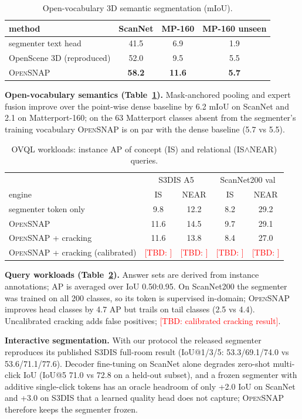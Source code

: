 \documentclass[conference]{IEEEtran}
\newcommand{\TBD}[1]{\textcolor{red}{[TBD: #1]}}
\newcommand{\sys}{\textsc{OpenSNAP}}
\newcommand{\ovql}{\textsc{OVQL}}
\begin{document}
\begin{table}[t]\centering\caption{Open-vocabulary 3D semantic segmentation (mIoU).}\label{tab:semseg}
\begin{tabular}{lccc}\toprule
method & ScanNet & MP-160 & MP-160 unseen \\\midrule
segmenter text head & 41.5 & 6.9 & 1.9 \\
OpenScene 3D (reproduced) & 52.0 & 9.5 & 5.5 \\
\sys{} & \textbf{58.2} & \textbf{11.6} & \textbf{5.7} \\\bottomrule
\end{tabular}\end{table}

\textbf{Open-vocabulary semantics (Table~\ref{tab:semseg}).} Mask-anchored pooling and expert fusion improve over the
point-wise dense baseline by 6.2 mIoU on ScanNet and 2.1 on Matterport-160; on the 63 Matterport classes absent from the
segmenter's training vocabulary \sys{} is on par with the dense baseline (5.7 vs 5.5).

\begin{table}[t]\centering\caption{\ovql{} workloads: instance AP of concept (\textsf{IS}) and relational
(\textsf{IS}$\wedge$\textsf{NEAR}) queries.}\label{tab:queries}
\begin{tabular}{lcccc}\toprule
 & \multicolumn{2}{c}{S3DIS A5} & \multicolumn{2}{c}{ScanNet200 val} \\
engine & IS & NEAR & IS & NEAR \\\midrule
segmenter token only & 9.8 & 12.2 & 8.2 & 29.2 \\
\sys{} & 11.6 & 14.5 & 9.7 & 29.1 \\
\sys{} + cracking & 11.6 & 13.8 & 8.4 & 27.0 \\
\sys{} + cracking (calibrated) & \TBD{} & \TBD{} & \TBD{} & \TBD{} \\\bottomrule
\end{tabular}\end{table}

\textbf{Query workloads (Table~\ref{tab:queries}).} Answer sets are derived from instance annotations; AP is averaged
over IoU 0.50:0.95. On ScanNet200 the segmenter was trained on all 200 classes, so its token is supervised in-domain;
\sys{} improves head classes by 4.7 AP but trails on tail classes (2.5 vs 4.4). Uncalibrated cracking adds false
positives; \TBD{calibrated cracking result}.

\textbf{Interactive segmentation.} With our protocol the released segmenter reproduces its published S3DIS full-room
result (IoU@1/3/5: 53.3/69.1/74.0 vs 53.6/71.1/77.6). Decoder fine-tuning on ScanNet alone degrades zero-shot
multi-click IoU (IoU@5 71.0 vs 72.8 on a held-out subset), and a frozen segmenter with additive single-click tokens has
an oracle headroom of only +2.0 IoU on ScanNet and +3.0 on S3DIS that a learned quality head does not capture; \sys{}
therefore keeps the segmenter frozen.
\end{document}
